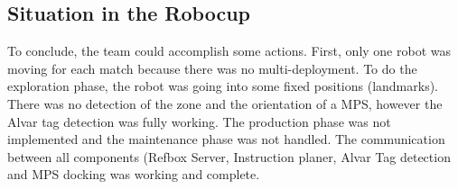 \subsection{Situation in the Robocup}

To conclude, the team could accomplish some actions. First, only one robot was moving for each match because there was no multi-deployment. To do the exploration phase, the robot was going into some fixed positions (landmarks). There was no detection of the zone and the orientation of a MPS, however the Alvar tag detection was fully working. The production phase was not implemented and the maintenance phase was not handled. The communication between all components (Refbox Server, Instruction planer, Alvar Tag detection and MPS docking was working and complete. 